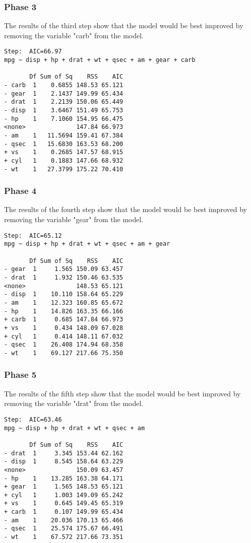 \documentclass[a4paper,12pt]{article}
\begin{document}
\subsubsection{Phase 3}
The results of the third step show that the model would be best improved by removing the variable "carb" from the model.
\footnotesize
\begin{verbatim}
Step:  AIC=66.97
mpg ~ disp + hp + drat + wt + qsec + am + gear + carb

       Df Sum of Sq    RSS    AIC
- carb  1    0.6855 148.53 65.121
- gear  1    2.1437 149.99 65.434
- drat  1    2.2139 150.06 65.449
- disp  1    3.6467 151.49 65.753
- hp    1    7.1060 154.95 66.475
<none>              147.84 66.973
- am    1   11.5694 159.41 67.384
- qsec  1   15.6830 163.53 68.200
+ vs    1    0.2685 147.57 68.915
+ cyl   1    0.1883 147.66 68.932
- wt    1   27.3799 175.22 70.410
\end{verbatim}
\normalsize
\subsubsection{Phase 4}
The results of the fourth step show that the model would be best improved by removing the variable "gear" from the model.
\footnotesize
\begin{verbatim}
Step:  AIC=65.12
mpg ~ disp + hp + drat + wt + qsec + am + gear

       Df Sum of Sq    RSS    AIC
- gear  1     1.565 150.09 63.457
- drat  1     1.932 150.46 63.535
<none>              148.53 65.121
- disp  1    10.110 158.64 65.229
- am    1    12.323 160.85 65.672
- hp    1    14.826 163.35 66.166
+ carb  1     0.685 147.84 66.973
+ vs    1     0.434 148.09 67.028
+ cyl   1     0.414 148.11 67.032
- qsec  1    26.408 174.94 68.358
- wt    1    69.127 217.66 75.350
\end{verbatim}
\normalsize
\newpage
\subsubsection{Phase 5}
The results of the fifth step show that the model would be best improved by removing the variable "drat" from the model.
\footnotesize
\begin{verbatim}
Step:  AIC=63.46
mpg ~ disp + hp + drat + wt + qsec + am

       Df Sum of Sq    RSS    AIC
- drat  1     3.345 153.44 62.162
- disp  1     8.545 158.64 63.229
<none>              150.09 63.457
- hp    1    13.285 163.38 64.171
+ gear  1     1.565 148.53 65.121
+ cyl   1     1.003 149.09 65.242
+ vs    1     0.645 149.45 65.319
+ carb  1     0.107 149.99 65.434
- am    1    20.036 170.13 65.466
- qsec  1    25.574 175.67 66.491
- wt    1    67.572 217.66 73.351
\end{verbatim}
\normalsize
\end{document}
